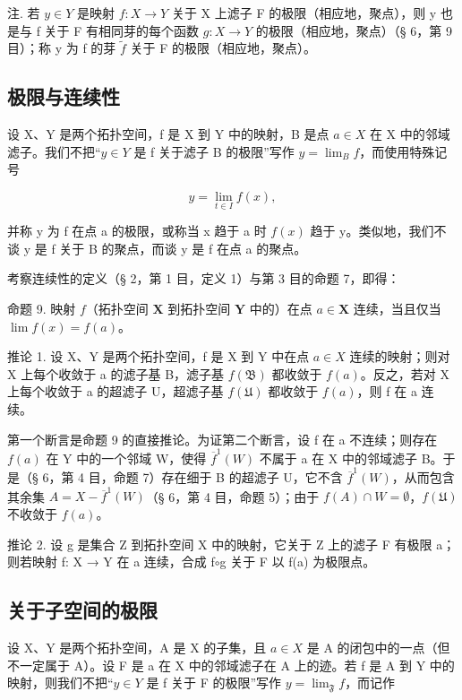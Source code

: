 注. 若 \(y \in Y\) 是映射 \(f: X \to Y\) 关于 X 上滤子 F 的极限（相应地，聚点），则 y 也是与 f 关于 F 有相同芽的每个函数 \(g: X \to Y\) 的极限（相应地，聚点）（§ 6，第 9 目）；称 y 为 f 的芽 \(\tilde{f}\) 关于 F 的极限（相应地，聚点）。

\subsection{极限与连续性}

设 X、Y 是两个拓扑空间，f 是 X 到 Y 中的映射，B 是点 \(a \in X\) 在 X 中的邻域滤子。我们不把“\(y \in Y\) 是 f 关于滤子 B 的极限”写作 \(y = \lim_{B} f\)，而使用特殊记号

\[
y = \lim _ {t \in I} f (x),
\]

并称 y 为 f 在点 a 的极限，或称当 x 趋于 a 时 \(f(x)\) 趋于 y。类似地，我们不谈 y 是 f 关于 B 的聚点，而谈 y 是 f 在点 a 的聚点。

考察连续性的定义（§ 2，第 1 目，定义 1）与第 3 目的命题 7，即得：

命题 9. 映射 \(f\)（拓扑空间 \(\mathbf{X}\) 到拓扑空间 \(\mathbf{Y}\) 中的）在点 \(a \in \mathbf{X}\) 连续，当且仅当 \(\lim f(x) = f(a)\)。

推论 1. 设 X、Y 是两个拓扑空间，f 是 X 到 Y 中在点 \(a \in X\) 连续的映射；则对 X 上每个收敛于 a 的滤子基 B，滤子基 \(f(\mathfrak{B})\) 都收敛于 \(f(a)\)。反之，若对 X 上每个收敛于 a 的超滤子 U，超滤子基 \(f(\mathfrak{U})\) 都收敛于 \(f(a)\)，则 f 在 a 连续。

第一个断言是命题 9 的直接推论。为证第二个断言，设 f 在 a 不连续；则存在 \(f(a)\) 在 Y 中的一个邻域 W，使得 \(\overline{f}^{1}(W)\) 不属于 a 在 X 中的邻域滤子 B。于是（§ 6，第 4 目，命题 7）存在细于 B 的超滤子 U，它不含 \(\overline{f}^{1}(W)\)，从而包含其余集 \(A = X - \overline{f}^{1}(W)\)（§ 6，第 4 目，命题 5）；由于 \(f(A) \cap W = \emptyset\)，\(f(\mathfrak{U})\) 不收敛于 \(f(a)\)。

推论 2. 设 g 是集合 Z 到拓扑空间 X 中的映射，它关于 Z 上的滤子 F 有极限 a；则若映射 f: X → Y 在 a 连续，合成 f\(\circ\)g 关于 F 以 f(a) 为极限点。

\subsection{关于子空间的极限}

设 X、Y 是两个拓扑空间，A 是 X 的子集，且 \(a \in X\) 是 A 的闭包中的一点（但不一定属于 A）。设 F 是 a 在 X 中的邻域滤子在 A 上的迹。若 f 是 A 到 Y 中的映射，则我们不把“\(y \in Y\) 是 f 关于 F 的极限”写作 \(y = \lim_{\mathfrak{F}} f\)，而记作

